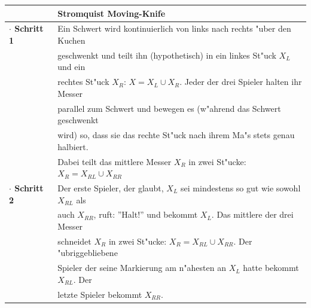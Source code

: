 \documentclass[11pt, a4paper, twoside]{article}
\numberwithin{equation}{section}
\begin{document}
\begin{tabular}{|ll|}
\hline
&\textbf{Stromquist Moving-Knife}\\
\hline
\textbf{$\cdot$ Schritt 1}& Ein Schwert wird kontinuierlich von links nach rechts "uber den Kuchen\\&geschwenkt und teilt ihn (hypothetisch) in ein linkes St"uck $X_L$ und ein\\&rechtes St"uck $X_R$: $X=X_L\cup X_R$. Jeder der drei Spieler halten ihr Messer\\&parallel zum Schwert und bewegen es (w"ahrend das Schwert geschwenkt\\&wird) so, dass sie das rechte St"uck nach ihrem Ma"s stets genau halbiert.\\&Dabei teilt das mittlere Messer $X_R$ in zwei St"ucke:$X_R=X_{RL}\cup X_{RR}$\\
\textbf{$\cdot$ Schritt 2}& Der erste Spieler, der glaubt, $X_L$ sei mindestens so gut wie sowohl $X_{RL}$ als\\&auch $ X_{RR}$, ruft: ''Halt!'' und bekommt $X_L$. Das mittlere der drei Messer\\&schneidet $X_R$ in zwei St"ucke: $X_R=X_{RL}\cup X_{RR}$. Der "ubriggebliebene\\& Spieler der seine Markierung am n"ahesten an $X_L$ hatte bekommt $X_{RL}$. Der \\&letzte Spieler bekommt $X_{RR}$.\\     
\hline
\end{tabular}
\end{document}
